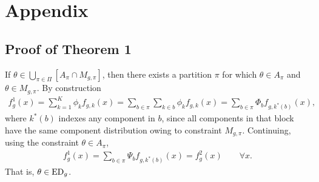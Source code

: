 \documentclass[aoas,preprint]{imsart}
\begin{document}
 

%



\newpage

 
\section*{Appendix}

\subsection*{Proof of Theorem 1}

If $\theta \in \bigcup_{\pi \in \Pi} \left[ A_{\pi} \cap M_{g, \pi} \right]$, then there exists a partition $\pi$
for which $\theta \in A_\pi$ and $\theta \in M_{g,\pi}$.   By construction
\begin{eqnarray*}
f^1_g(x) = \sum_{k=1}^K \phi_k f_{g,k}(x) 
         = \sum_{b \in \pi} \sum_{k \in b} \phi_k f_{g,k}(x) 
         = \sum_{b \in \pi} \Phi_b f_{g,k^*(b)}(x) ,
\end{eqnarray*}
where $k^*(b)$ indexes any component in $b$, since all components in that block have the same component distribution
owing to constraint $M_{g,\pi}$. Continuing, using the constraint $\theta \in A_{\pi}$,
\begin{eqnarray*}
f^1_g(x) = \sum_{b \in \pi} \Psi_b f_{g,k^*(b)}(x) = f^2_g(x)   \qquad \forall x.
\end{eqnarray*}
That is, $\theta \in {\mbox {\rm ED}}_g$.
\end{document}
